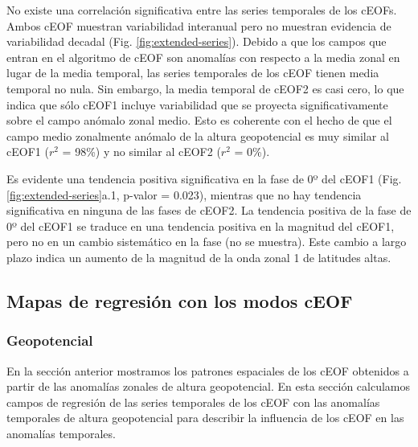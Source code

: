 \documentclass[12pt,oneside,a4paper]{reedthesis}
\begin{document}
No existe una correlación significativa entre las series temporales de los cEOFs.
Ambos cEOF muestran variabilidad interanual pero no muestran evidencia de variabilidad decadal (Fig. \ref{fig:extended-series}).
Debido a que los campos que entran en el algoritmo de cEOF son anomalías con respecto a la media zonal en lugar de la media temporal, las series temporales de los cEOF tienen media temporal no nula.
Sin embargo, la media temporal de cEOF2 es casi cero, lo que indica que sólo cEOF1 incluye variabilidad que se proyecta significativamente sobre el campo anómalo zonal medio.
Esto es coherente con el hecho de que el campo medio zonalmente anómalo de la altura geopotencial es muy similar al cEOF1 (\(r^2\) = 98\%) y no similar al cEOF2 (\(r^2\) = 0\%).

Es evidente una tendencia positiva significativa en la fase de 0º del cEOF1 (Fig. \ref{fig:extended-series}a.1, p-valor = 0.023), mientras que no hay tendencia significativa en ninguna de las fases de cEOF2.
La tendencia positiva de la fase de 0º del cEOF1 se traduce en una tendencia positiva en la magnitud del cEOF1, pero no en un cambio sistemático en la fase (no se muestra).
Este cambio a largo plazo indica un aumento de la magnitud de la onda zonal 1 de latitudes altas.

\hypertarget{mapas-de-regresiuxf3n-con-los-modos-ceof}{%
\subsection{Mapas de regresión con los modos cEOF}\label{mapas-de-regresiuxf3n-con-los-modos-ceof}}

\hypertarget{geopotencial}{%
\subsubsection{Geopotencial}\label{geopotencial}}

En la sección anterior mostramos los patrones espaciales de los cEOF obtenidos a partir de las anomalías zonales de altura geopotencial.
En esta sección calculamos campos de regresión de las series temporales de los cEOF con las anomalías temporales de altura geopotencial para describir la influencia de los cEOF en las anomalías temporales.
\end{document}
